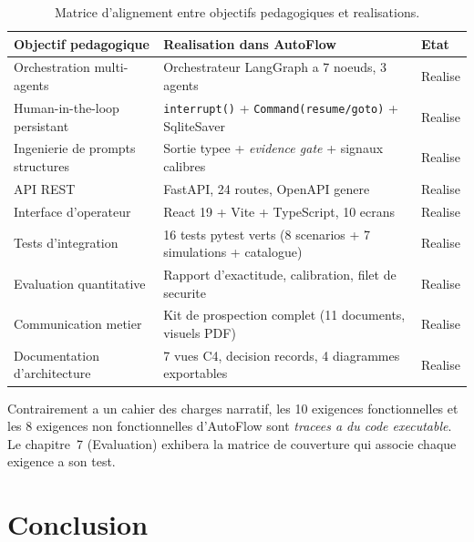 \documentclass[12pt,a4paper,openany]{report}
\begin{document}
\begin{table}[H]\centering\small
\caption{Matrice d'alignement entre objectifs pedagogiques et realisations.}
\label{tab:alignement}
\begin{tabularx}{\textwidth}{X X >{\centering\arraybackslash}p{2cm}}\toprule
\rowcolor{emsiGreen!30}\textbf{Objectif pedagogique} & \textbf{Realisation dans AutoFlow} & \textbf{Etat}\\\midrule
Orchestration multi-agents         & Orchestrateur LangGraph a 7 noeuds, 3 agents & Realise\\
Human-in-the-loop persistant       & \texttt{interrupt()} + \texttt{Command(resume/goto)} + SqliteSaver & Realise\\
Ingenierie de prompts structures   & Sortie typee + \emph{evidence gate} + signaux calibres & Realise\\
API REST                           & FastAPI, 24 routes, OpenAPI genere & Realise\\
Interface d'operateur              & React 19 + Vite + TypeScript, 10 ecrans & Realise\\
Tests d'integration                & 16 tests pytest verts (8 scenarios + 7 simulations + catalogue) & Realise\\
Evaluation quantitative            & Rapport d'exactitude, calibration, filet de securite & Realise\\
Communication metier               & Kit de prospection complet (11 documents, visuels PDF) & Realise\\
Documentation d'architecture       & 7 vues C4, decision records, 4 diagrammes exportables & Realise\\
\bottomrule
\end{tabularx}
\end{table}

\begin{mechanismbox}
Contrairement a un cahier des charges narratif, les 10 exigences fonctionnelles et les 8 exigences non fonctionnelles d'AutoFlow sont \emph{tracees a du code executable}. Le chapitre~7 (Evaluation) exhibera la matrice de couverture qui associe chaque exigence a son test.
\end{mechanismbox}

\section{Conclusion}
\end{document}
